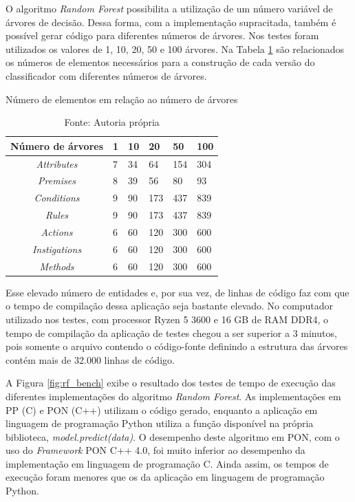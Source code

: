 O algoritmo \textit{Random Forest} possibilita a utilização de um número
variável de árvores de decisão. Dessa forma, com a implementação supracitada,
também é possível gerar código para diferentes números de árvores. Nos testes
foram utilizados os valores de 1, 10, 20, 50 e 100 árvores. Na Tabela
\ref{tab:elementos_arvores} são relacionados os números de elementos necessários
para a construção de cada versão do classificador com diferentes números de
árvores.

\begin{table}[!htb]
\centering
\caption{Número de elementos em relação ao número de árvores}
\caption*{Fonte: Autoria própria}
\label{tab:elementos_arvores}
\smallskip
\begin{tabularx}{0.8\textwidth}{|c|X|X|X|X|X|}
\hline
\textbf{Número de árvores} & 1 & 10 & 20 & 50 & 100\\
\hline
\hline
\textit{Attributes} & 7 & 34 & 64 & 154 & 304 \\
\hline
\textit{Premises} & 8 & 39 & 56 & 80 & 93 \\
\hline
\textit{Conditions} & 9 & 90 & 173 & 437 & 839 \\
\hline
\textit{Rules} & 9 & 90 & 173 & 437 & 839 \\
\hline
\textit{Actions} & 6 & 60 & 120 & 300 & 600 \\
\hline
\textit{Instigations} & 6 & 60 & 120 & 300 & 600 \\
\hline
\textit{Methods} & 6 & 60 & 120 & 300 & 600 \\
\hline
\end{tabularx}
\end{table}

Esse elevado número de entidades e, por sua vez, de linhas de código faz com que
o tempo de compilação dessa aplicação seja bastante elevado. No computador
utilizado nos testes, com processor Ryzen 5 3600 e 16 GB de RAM DDR4, o tempo de
compilação da aplicação de testes chegou a ser superior a 3 minutos, pois
somente o arquivo contendo o código-fonte definindo a estrutura das árvores
contém mais de 32.000 linhas de código.

A Figura \ref{fig:rf_bench} exibe o resultado dos testes de tempo de execução
das diferentes implementações do algoritmo \textit{Random Forest}. As
implementações em PP (C) e PON (C++) utilizam o código gerado, enquanto a
aplicação em linguagem de programação Python utiliza a função disponível na
própria biblioteca, \textit{model.predict(data)}. O desempenho deste algoritmo
em PON, com o uso do \textit{Framework} PON C++ 4.0, foi muito inferior ao
desempenho da implementação em linguagem de programação C. Ainda assim, os
tempos de execução foram menores que os da aplicação em linguagem de programação
Python.

